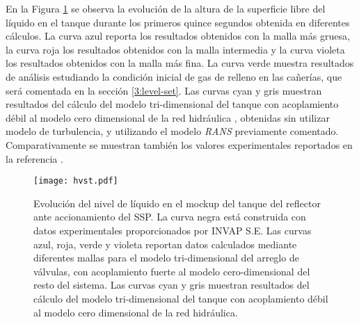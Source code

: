 
En la Figura \ref{hvst} se observa la evolución de la altura de la superficie libre del líquido en el tanque durante los primeros quince segundos obtenida en diferentes cálculos.
La curva azul reporta los resultados obtenidos con la malla más gruesa, la curva roja los resultados obtenidos con la malla intermedia y la curva violeta los resultados obtenidos con la malla más fina.
La curva verde muestra resultados de análisis estudiando la condición inicial de gas de relleno en las cañerías, que será comentada en la sección \ref{3:level-set}.
Las curvas cyan y gris muestran resultados del cálculo del modelo tri-dimensional del tanque con acoplamiento débil al modelo cero dimensional de la red hidráulica \cite{ra10-paper},
obtenidas sin utilizar modelo de turbulencia, y utilizando el modelo \textit{RANS} previamente comentado.
Comparativamente se muestran también los valores experimentales reportados en la referencia \cite{invap-mockup}.

\begin{figure}[ht]
\centering
\texttt{[image: hvst.pdf]}
\caption{Evolución del nivel de líquido en el mockup del tanque del reflector ante accionamiento del SSP.
La curva negra está construida con datos experimentales proporcionados por INVAP S.E.
Las curvas azul, roja, verde y violeta reportan datos calculados mediante diferentes mallas para el modelo tri-dimensional del arreglo de válvulas, 
con acoplamiento fuerte al modelo cero-dimensional del resto del sistema.
Las curvas cyan y gris muestran resultados del cálculo del modelo tri-dimensional del tanque con acoplamiento débil al modelo cero dimensional de la red hidráulica.}
\label{hvst} 
\end{figure}

